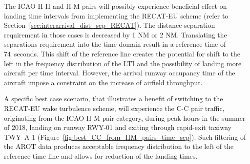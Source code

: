
The ICAO H-H and H-M pairs will possibly experience beneficial effect on landing time intervals from implementing the RECAT-EU scheme (refer to Section~\ref{sec:interarrival_dist_sep_RECAT}). The distance separation requirement in those cases is decreased by 1 NM or 2 NM. Translating the separations requirement into the time domain result in a reference time of 74~seconds. This shift of the reference line creates the potential for shift to the left in the frequency distribution of the LTI and the possibility of landing more aircraft per time interval. However, the arrival runway occupancy time of the aircraft impose a constraint on the increase of airfield throughput.
 

A specific best case scenario, that illustrates a benefit of switching to the RECAT-EU wake turbulence scheme, will experience the C-C pair traffic, originating from the ICAO H-M pair category, during peak hours in the summer of 2018, landing on runway RWY-01 and exiting through rapid-exit taxiway TWY~A-1 (Figure~\ref{fig:best_CC_from_HM_pairs_time_sep}). Such filtering of the AROT data produces acceptable frequency distribution to the left of the reference time line and allows for reduction of the landing times.

